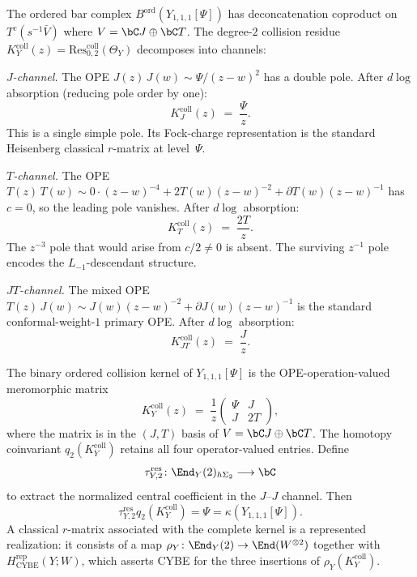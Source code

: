 \begin{computation}%
\label{comp:y111-collision-residue}
The ordered bar complex $B^{\mathrm{ord}}(Y_{1,1,1}[\Psi])$
has deconcatenation coproduct on $T^c(s^{-1}\bar{V})$ where
$V = \bC J \oplus \bC T$. The degree-$2$ collision residue
$K_Y^{\mathrm{coll}}(z) = \mathrm{Res}^{\mathrm{coll}}_{0,2}(\Theta_Y)$
decomposes into channels:

\emph{$J$-channel.}
The OPE $J(z)\,J(w) \sim \Psi/(z-w)^2$ has a double pole.
After $d\log$ absorption (reducing pole order by one):
\begin{equation}\label{eq:y111-r-j-channel}
K_J^{\mathrm{coll}}(z) \;=\; \frac{\Psi}{z}.
\end{equation}
This is a single simple pole.  Its Fock-charge representation is the
standard Heisenberg classical $r$-matrix at level~$\Psi$.

\emph{$T$-channel.}
The OPE $T(z)\,T(w) \sim 0\cdot(z-w)^{-4} + 2T(w)(z-w)^{-2}
+ \partial T(w)(z-w)^{-1}$ has $c = 0$, so the leading pole
vanishes. After $d\log$ absorption:
\begin{equation}\label{eq:y111-r-t-channel}
K_T^{\mathrm{coll}}(z) \;=\; \frac{2T}{z}.
\end{equation}
The $z^{-3}$ pole that would arise from $c/2 \neq 0$ is
absent. The surviving $z^{-1}$ pole encodes the
$L_{-1}$-descendant structure.

\emph{$JT$-channel.}
The mixed OPE $T(z)\,J(w) \sim J(w)(z-w)^{-2}
+ \partial J(w)(z-w)^{-1}$ is the standard conformal-weight-$1$
primary OPE. After $d\log$ absorption:
\begin{equation}\label{eq:y111-r-jt-channel}
K_{JT}^{\mathrm{coll}}(z) \;=\; \frac{J}{z}.
\end{equation}

The binary ordered collision kernel of $Y_{1,1,1}[\Psi]$ is the
OPE-operation-valued meromorphic matrix
\begin{equation}\label{eq:y111-r-full}
K_Y^{\mathrm{coll}}(z) \;=\;
\frac{1}{z}
\begin{pmatrix}
\Psi & J \\
J & 2T
\end{pmatrix},
\end{equation}
where the matrix is in the $(J, T)$ basis of
$V = \bC J \oplus \bC T$.  The homotopy coinvariant
$q_2(K_Y^{\mathrm{coll}})$ retains all four operator-valued entries.
Define
\[
 \tau_{Y,2}^{\mathrm{res}}\colon
 \End_Y(2)_{h\Sigma_2}\longrightarrow\bC
\]
to extract the normalized central coefficient in the $J$--$J$
channel.  Then
\[
 \tau_{Y,2}^{\mathrm{res}}q_2(K_Y^{\mathrm{coll}})=\Psi
 =\kappa(Y_{1,1,1}[\Psi]).
\]
A classical $r$-matrix associated with the complete kernel is a
represented realization: it consists of a map
$\rho_Y\colon\End_Y(2)\to\End(W^{\otimes2})$ together with
$H_{\mathrm{CYBE}}^{\mathrm{rep}}(Y;W)$, which asserts CYBE for the
three insertions of $\rho_Y(K_Y^{\mathrm{coll}})$.
\end{computation}

